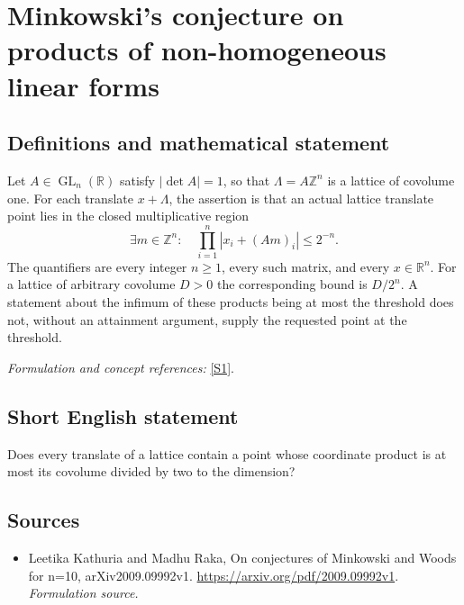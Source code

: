 \documentclass[11pt]{article}
\begin{document}
\section*{\texorpdfstring{Minkowski's conjecture on products of non-homogeneous linear forms}{Minkowski's conjecture on products of non-homogeneous linear forms}}\label{429}
\subsection{Definitions and mathematical statement}
Let $A\in\operatorname{GL}_n({\mathbb{R}})$ satisfy $|\det A|=1$, so that $\Lambda=A{\mathbb{Z}}^n$ is a lattice of covolume one. For each translate $x+\Lambda$, the assertion is that an actual lattice translate point lies in the closed multiplicative region
\[
 \exists m\in{\mathbb{Z}}^n:\quad \prod_{i=1}^n|x_i+(Am)_i|\le2^{-n}.
\]
The quantifiers are every integer $n\ge1$, every such matrix, and every $x\in{\mathbb{R}}^n$. For a lattice of arbitrary covolume $D>0$ the corresponding bound is $D/2^n$. A statement about the infimum of these products being at most the threshold does not, without an attainment argument, supply the requested point at the threshold.
\par\smallskip\textit{Formulation and concept references:} \href{https://arxiv.org/pdf/2009.09992v1}{[S1]}.

\subsection{Short English statement}
Does every translate of a lattice contain a point whose coordinate product is at most its covolume divided by two to the dimension?
\subsection{Sources}
\begin{itemize}
\item[S1]Leetika Kathuria and Madhu Raka, On conjectures of Minkowski and Woods for n=10, arXiv2009.09992v1.
\url{https://arxiv.org/pdf/2009.09992v1}.
\textit{Formulation source.}
\end{itemize}
\end{document}
